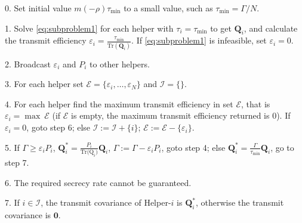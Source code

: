 \documentclass[12pt,journal,draftclsnofoot,onecolumn]{IEEEtran}
\begin{document}
\begin{algorithm}
	\caption{}\label{alg:regularization parameter}
	\begin{algorithmic}
		\item[0.] Set initial value $m(-\rho)$$\tau_{\mathrm{min}}$ to a small value, such as $\tau_{\mathrm{min}} = \Gamma/N$. 
		\item[1.] Solve \eqref{eq:subproblem1} for each helper with $\tau_i = \tau_{\mathrm{min}}$ to get $\mathbf{Q}_i$, and calculate the transmit efficiency $\varepsilon_i = \frac{\tau_{\mathrm{min}}}{\mathrm{Tr}(\mathbf{Q}_i)}$. If \eqref{eq:subproblem1} is infeasible, set $\varepsilon_i = 0$.
		\item[2.] Broadcast $\varepsilon_i$ and $P_i$ to other helpers. 
		\item[3.] For each helper set $\mathcal{E} =\{ {\varepsilon_i,\ldots, \varepsilon_N}\}$ and $\mathcal{I} =\{\}$.
		\item[4.] For each helper find the maximum transmit efficiency in set $\mathcal{E}$, that is $\varepsilon_i = \max~\mathcal{E}$ (if $\mathcal{E}$ is empty,  the maximum transmit efficiency returned is 0). If $\varepsilon_i = 0$, goto step 6; else $\mathcal{I} := \mathcal{I} + \{i\}$; $\mathcal{E} := \mathcal{E}  - \{\varepsilon_i\}$.
		\item[5.] If $\Gamma \geq \varepsilon_{i} P_i$, $\mathbf{Q}_{i}^* = \frac{P_i}{\mathrm{Tr(\mathrm{Q}}_i)}\mathbf{Q}_i$, $\Gamma := \Gamma - \varepsilon_iP_i$, goto step 4; else $\mathbf{Q}_{i}^* = \frac{\Gamma}{\tau_\mathrm{min}}\mathbf{Q}_i$, go to step 7.
		\item[6.] The required secrecy rate cannot be guaranteed.
		\item[7.] If $i \in \mathcal{I}$, the transmit covariance of Helper-$i$ is $\mathbf{Q}_i^*$, otherwise the transmit covariance is $\mathbf{0}$.
		
	\end{algorithmic}
\end{algorithm}
\end{document}
